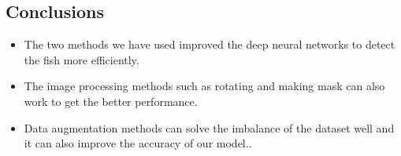 \documentclass[a0,portrait]{a0poster}
\begin{document}
\begin{multicols}{2}

\color{SaddleBrown} %

\section*{Conclusions}

\begin{itemize}
\item The two methods we have used improved the deep neural networks to detect the fish more efficiently.
\item The image processing methods such as rotating and making mask can also work to get the better performance.
\item Data augmentation methods can solve the imbalance of the dataset well and it can also improve the accuracy of our model..
\end{itemize}

\color{DarkSlateGray} %




\nocite{*} %





\end{multicols}
\end{document}
